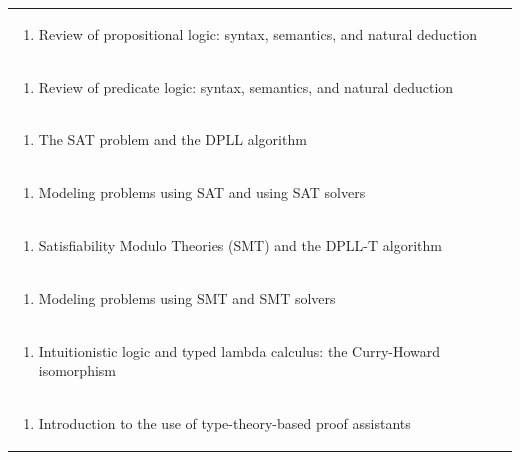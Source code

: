 \documentclass[11pt]{article}
\begin{document}
\begin{center}
\begin{longtable}{|p{4cm}|p{4cm}|p{4cm}|p{4cm}|}
\multicolumn{4}{|p{\dimexpr 16cm + 6\tabcolsep\relax}|}{\begin{enumerate}[start=2]\item Review of propositional logic: syntax, semantics, and natural deduction\end{enumerate}}\\
\multicolumn{4}{|p{\dimexpr 16cm + 6\tabcolsep\relax}|}{\begin{enumerate}[start=3]\item Review of predicate logic: syntax, semantics, and natural deduction\end{enumerate}}\\
\multicolumn{4}{|p{\dimexpr 16cm + 6\tabcolsep\relax}|}{\begin{enumerate}[start=4]\item The SAT problem and the DPLL algorithm\end{enumerate}}\\
\multicolumn{4}{|p{\dimexpr 16cm + 6\tabcolsep\relax}|}{\begin{enumerate}[start=5]\item Modeling problems using SAT and using SAT solvers\end{enumerate}}\\
\multicolumn{4}{|p{\dimexpr 16cm + 6\tabcolsep\relax}|}{\begin{enumerate}[start=6]\item Satisfiability Modulo Theories (SMT) and the DPLL-T algorithm\end{enumerate}}\\
\multicolumn{4}{|p{\dimexpr 16cm + 6\tabcolsep\relax}|}{\begin{enumerate}[start=7]\item Modeling problems using SMT and SMT solvers\end{enumerate}}\\
\multicolumn{4}{|p{\dimexpr 16cm + 6\tabcolsep\relax}|}{\begin{enumerate}[start=8]\item Intuitionistic logic and typed lambda calculus: the Curry-Howard isomorphism\end{enumerate}}\\
\multicolumn{4}{|p{\dimexpr 16cm + 6\tabcolsep\relax}|}{\begin{enumerate}[start=9]\item Introduction to the use of type-theory-based proof assistants\end{enumerate}}\\

\end{longtable}
\end{center}
\end{document}

